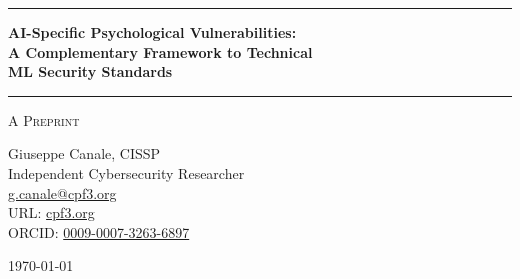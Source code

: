 \documentclass[11pt,a4paper]{article}
\begin{document}
\thispagestyle{empty}
\begin{center}

\vspace*{0.5cm}

\rule{\textwidth}{1.5pt}

\vspace{0.5cm}

{\LARGE \textbf{AI-Specific Psychological Vulnerabilities:}}\\[0.3cm]
{\LARGE \textbf{A Complementary Framework to Technical}}\\[0.3cm]
{\LARGE \textbf{ML Security Standards}}

\vspace{0.5cm}

\rule{\textwidth}{1.5pt}

\vspace{0.3cm}

{\large \textsc{A Preprint}}

\vspace{0.5cm}

{\Large Giuseppe Canale, CISSP}\\[0.2cm]
Independent Cybersecurity Researcher\\[0.1cm]
\href{mailto:g.canale@cpf3.org}{g.canale@cpf3.org}\\[0.1cm]
URL: \href{https://cpf3.org}{cpf3.org}\\[0.1cm]
ORCID: \href{https://orcid.org/0009-0007-3263-6897}{0009-0007-3263-6897}

\vspace{0.8cm}

{\large \today}

\vspace{1cm}

\end{center}
\end{document}
